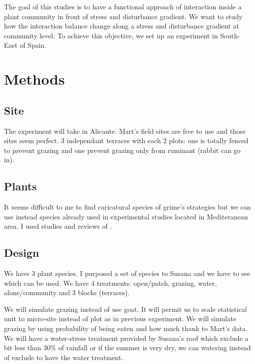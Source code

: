 \documentclass[12pt]{article} %
\begin{document}
The goal of this studies is to have a functional approach of interaction inside a plant community in front of stress and disturbance gradient. We want to study how the interaction balance change along a stress and disturbance gradient at community level. To achieve this objective, we set up an experiment in South-East of Spain.



\section{Methods}

\subsection{Site}

The experiment will take in Alicante. Mart's field sites are free to use and those sites seem perfect. 3 independant terraces with each 2 plots: one is totally fenced to prevent grazing and one prevent grazing only from ruminant (rabbit can go in). 

\subsection{Plants}

It seems difficult to me to find caricatural species of grime's strategies but we can use instead species already used in experimental studies located in Mediteranean area. I used studies and reviews of \citet{McCluney2012,Navarro2006, Jauffret2003}.



\subsection{Design}

We have 3 plant species. I purposed a set of species to Susana and we have to see which can be used. We have 4 treatments: open/patch, grazing, water, alone/community and 3 blocks (terraces).

 We will simulate grazing instead of use goat. It will permit us to scale statistical unit to micro-site instead of plot as in previous experiment. We will simulate grazing by using probability of being eaten and how much thank to Mart's data. 
We will have a water-stress treatment provided by Susana's roof which exclude a bit less than 30\% of rainfall or if the summer is very dry, we can watering instead of exclude to have the water treatment.
\end{document}
